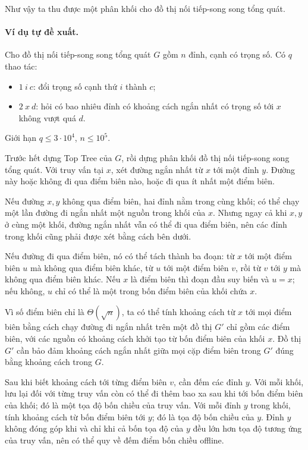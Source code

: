 \documentclass[11pt]{article}
\begin{document}
Như vậy ta thu được một phân khối cho đồ thị nối tiếp-song song tổng quát.

\paragraph{Ví dụ tự đề xuất.}
Cho đồ thị nối tiếp-song song tổng quát \(G\) gồm \(n\) đỉnh, cạnh có trọng
số. Có \(q\) thao tác:
\begin{itemize}
  \item \(1\ i\ c\): đổi trọng số cạnh thứ \(i\) thành \(c\);
  \item \(2\ x\ d\): hỏi có bao nhiêu đỉnh có khoảng cách ngắn nhất có trọng
  số tới \(x\) không vượt quá \(d\).
\end{itemize}
Giới hạn \(q\le 3\cdot 10^4\), \(n\le 10^5\).

Trước hết dựng Top Tree của \(G\), rồi dựng phân khối đồ thị nối tiếp-song
song tổng quát. Với truy vấn tại \(x\), xét đường ngắn nhất từ \(x\) tới một
đỉnh \(y\). Đường này hoặc không đi qua điểm biên nào, hoặc đi qua ít nhất một
điểm biên.

Nếu đường \(x,y\) không qua điểm biên, hai đỉnh nằm trong cùng khối; có thể
chạy một lần đường đi ngắn nhất một nguồn trong khối của \(x\). Nhưng ngay cả
khi \(x,y\) ở cùng một khối, đường ngắn nhất vẫn có thể đi qua điểm biên, nên
các đỉnh trong khối cũng phải được xét bằng cách bên dưới.

Nếu đường đi qua điểm biên, nó có thể tách thành ba đoạn: từ \(x\) tới một
điểm biên \(u\) mà không qua điểm biên khác, từ \(u\) tới một điểm biên
\(v\), rồi từ \(v\) tới \(y\) mà không qua điểm biên khác. Nếu \(x\) là điểm
biên thì đoạn đầu suy biến và \(u=x\); nếu không, \(u\) chỉ có thể là một trong
bốn điểm biên của khối chứa \(x\).

Vì số điểm biên chỉ là \(\Theta(\sqrt n)\), ta có thể tính khoảng cách từ
\(x\) tới mọi điểm biên bằng cách chạy đường đi ngắn nhất trên một đồ thị
\(G'\) chỉ gồm các điểm biên, với các nguồn có khoảng cách khởi tạo từ bốn
điểm biên của khối \(x\). Đồ thị \(G'\) cần bảo đảm khoảng cách ngắn nhất giữa
mọi cặp điểm biên trong \(G'\) đúng bằng khoảng cách trong \(G\).

Sau khi biết khoảng cách tới từng điểm biên \(v\), cần đếm các đỉnh \(y\). Với
mỗi khối, lưu lại đối với từng truy vấn còn có thể đi thêm bao xa sau khi tới
bốn điểm biên của khối; đó là một tọa độ bốn chiều của truy vấn. Với mỗi đỉnh
\(y\) trong khối, tính khoảng cách từ bốn điểm biên tới \(y\); đó là tọa độ
bốn chiều của \(y\). Đỉnh \(y\) không đóng góp khi và chỉ khi cả bốn tọa độ của
\(y\) đều lớn hơn tọa độ tương ứng của truy vấn, nên có thể quy về đếm điểm
bốn chiều offline.
\end{document}

